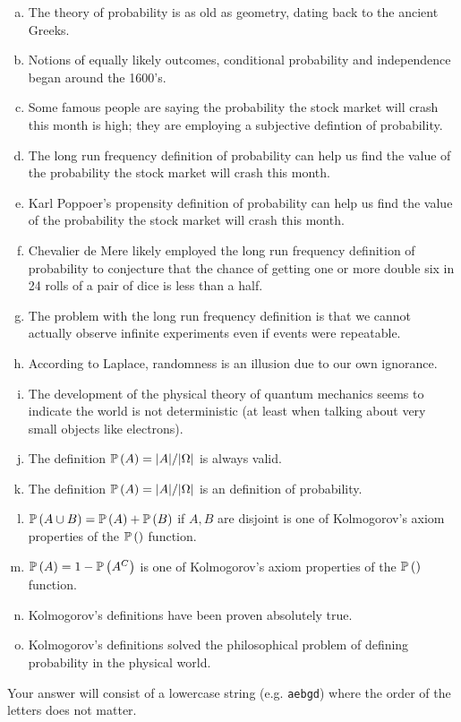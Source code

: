 \documentclass[12pt,landscape]{article}
\newcommand{\instr}{\small Your answer will consist of a lowercase string (e.g. \texttt{aebgd}) where the order of the letters does not matter. \normalsize}
\begin{document}
\vspace{-0.2cm}\benum{} 
\begin{enumerate}[(a)]
\item The theory of probability is as old as geometry, dating back to the ancient Greeks.
\item Notions of equally likely outcomes, conditional probability and independence began around the 1600's.

\item Some famous people are saying the probability the stock market will crash this month is high; they are employing a subjective defintion of probability.
\item The long run frequency definition of probability can help us find the value of the probability the stock market will crash this month.
\item Karl Poppoer's propensity definition of probability can help us find the value of the probability the stock market will crash this month.
\item Chevalier de Mere likely employed the long run frequency definition of probability to conjecture that the chance of getting one or more double six in 24 rolls of a pair of dice is less than a half.
\item The problem with the long run frequency definition is that we cannot actually observe infinite experiments even if events were repeatable.

\item According to Laplace, randomness is an illusion due to our own ignorance.
\item The development of the physical theory of quantum mechanics seems to indicate the world is not deterministic (at least when talking about very small objects like electrons).


\item The definition $\mathbb{P}\left(A\right) = |A| / |\Omega|$ is always valid.
\item The definition $\mathbb{P}\left(A\right) = |A| / |\Omega|$ is an  definition of probability.
\item $\mathbb{P}\left(A \cup B\right) = \mathbb{P}\left(A\right) + \mathbb{P}\left(B\right)$ if $A,B$ are disjoint is one of Kolmogorov's axiom properties of the $\mathbb{P}\left(\right)$ function.
\item $\mathbb{P}\left(A\right) = 1 - \mathbb{P}\left(A^C\right)$ is one of Kolmogorov's axiom properties of the $\mathbb{P}\left(\right)$ function.
\item Kolmogorov's definitions have been proven absolutely true.
\item Kolmogorov's definitions solved the philosophical problem of defining probability in the physical world.
\end{enumerate}
\eenum\instr\pagebreak
\end{document}
